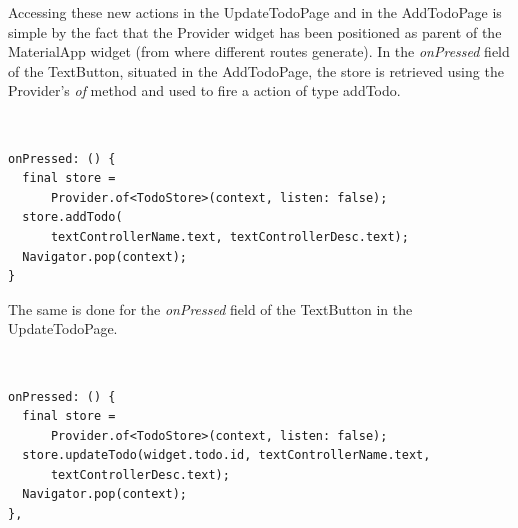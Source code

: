 Accessing these new actions in the UpdateTodoPage and in the AddTodoPage is simple by the fact that the Provider widget has been positioned as parent of the MaterialApp widget (from where different routes generate). In the \textit{onPressed} field of the TextButton, situated in the AddTodoPage, the store is retrieved using the Provider’s \textit{of} method and used to fire a action of type addTodo. 
\begin{code}
\mbox{}\\
 \mbox{}
		\label{code:2.14}
\begin{verbatim}
onPressed: () {
  final store =
      Provider.of<TodoStore>(context, listen: false);
  store.addTodo(
      textControllerName.text, textControllerDesc.text);
  Navigator.pop(context);
}
\end{verbatim}
\mbox{}
\end{code}

The same is done for the \textit{onPressed} field of the TextButton in the UpdateTodoPage.
\begin{code}
\mbox{}\\
 \mbox{}
		\label{code:2.14}
\begin{verbatim}
onPressed: () {
  final store =
      Provider.of<TodoStore>(context, listen: false);
  store.updateTodo(widget.todo.id, textControllerName.text,
      textControllerDesc.text);
  Navigator.pop(context);
},
\end{verbatim}
\mbox{}
\end{code}

